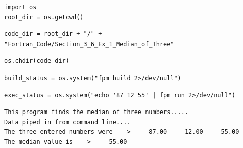 \begin{verbatim}
import os
root_dir = os.getcwd()
\end{verbatim}

\begin{verbatim}
code_dir = root_dir + "/" + "Fortran_Code/Section_3_6_Ex_1_Median_of_Three"
\end{verbatim}

\begin{verbatim}
os.chdir(code_dir)
\end{verbatim}

\begin{verbatim}
build_status = os.system("fpm build 2>/dev/null")
\end{verbatim}

\begin{verbatim}
exec_status = os.system("echo '87 12 55' | fpm run 2>/dev/null")
\end{verbatim}

\begin{verbatim}
This program finds the median of three numbers.....
Data piped in from command line....
The three entered numbers were - ->     87.00     12.00     55.00
The median value is - ->     55.00
\end{verbatim}
